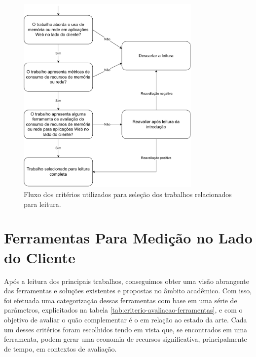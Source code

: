 \documentclass[12pt]{tcc}
\begin{document}
	\begin{figure}[H]
		\centering
		\includegraphics[width=0.8\textwidth]{figures/fluxo-decisao-leitura.pdf}
		\caption{Fluxo dos critérios utilizados para seleção dos trabalhos relacionados para leitura.}
		\label{fig:fluxo-leitura}
	\end{figure}

	\section{Ferramentas Para Medição no Lado do Cliente}
	\label{sec:ferramentas-medicao-clientside}

	Após a leitura dos principais trabalhos, conseguimos obter uma visão abrangente das ferramentas e soluções existentes e propostas no âmbito acadêmico. Com isso, foi efetuada uma categorização dessas ferramentas com base em uma série de parâmetros, explicitados na tabela \ref{tab:criterio-avaliacao-ferramentas}, e com o objetivo de avaliar o quão complementar é o  em relação ao estado da arte. Cada um desses critérios foram escolhidos tendo em vista que, se encontrados em uma ferramenta, podem gerar uma economia de recursos significativa, principalmente de tempo, em contextos de avaliação.
\end{document}
